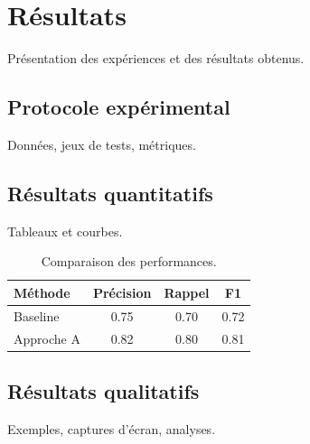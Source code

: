 \chapter{Résultats}
\label{chap:resultats}

Présentation des expériences et des résultats obtenus.

\section{Protocole expérimental}
Données, jeux de tests, métriques.

\section{Résultats quantitatifs}
Tableaux et courbes.

\begin{table}[htbp]
  \centering
  \caption{Comparaison des performances.}
  \begin{tabular}{lccc}
    \toprule
    Méthode & Précision & Rappel & F1 \\
    \midrule
    Baseline & 0.75 & 0.70 & 0.72 \\
    Approche A & 0.82 & 0.80 & 0.81 \\
    \bottomrule
  \end{tabular}
  \label{tab:resultats}
\end{table}

\section{Résultats qualitatifs}
Exemples, captures d'écran, analyses.